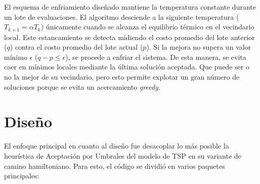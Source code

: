\documentclass[12pt,letterpaper]{article}
\begin{document}
El esquema de enfriamiento diseñado mantiene la temperatura constante durante un lote de evaluaciones. El algoritmo desciende a la siguiente temperatura ($T_{k+1} = \alpha T_k$) únicamente cuando se alcanza el equilibrio térmico en el vecindario local. Este estancamiento se detecta midiendo el costo promedio del lote anterior ($q$) contra el costo promedio del lote actual ($p$). Si la mejora no supera un valor mínimo $\epsilon$ ($q - p \le \epsilon$), se procede a enfriar el sistema. De esta manera, se evita caer en mínimos locales mediante la última solución aceptada. Que puede ser o no la mejor de su vecindario, pero esto permite explotar un gran número de soluciones porque se evita un acercamiento \textit{greedy}.

\section{Diseño}
El enfoque principal en cuanto al diseño fue desacoplar lo más posible la heurística de Aceptación por Umbrales del modelo de TSP en su variante de camino hamiltoniano. Para esto, el código se dividió en varios paquetes principales:
\end{document}
